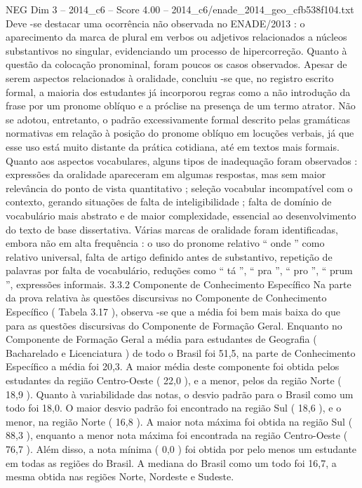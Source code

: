 \begin{textsample}{NEG Dim 3 – 2014\_c6 – Score 4.00 – 2014\_c6/enade\_2014\_geo\_cfb538f104.txt}
Deve -se destacar uma ocorrência não observada no ENADE/2013 : o aparecimento da marca de plural em verbos ou adjetivos relacionados a núcleos substantivos no singular, evidenciando um processo de hipercorreção.
Quanto à questão da colocação pronominal, foram poucos os casos observados.
Apesar de serem aspectos relacionados à oralidade, concluiu -se que, no registro escrito formal, a maioria dos estudantes já incorporou regras como a não introdução da frase por um pronome oblíquo e a próclise na presença de um termo atrator.
Não se adotou, entretanto, o padrão excessivamente formal descrito pelas gramáticas normativas em relação à posição do pronome oblíquo em locuções verbais, já que esse uso está muito distante da prática cotidiana, até em textos mais formais.
Quanto aos aspectos vocabulares, alguns tipos de inadequação foram observados : expressões da oralidade apareceram em algumas respostas, mas sem maior relevância do ponto de vista quantitativo ; seleção vocabular incompatível com o contexto, gerando situações de falta de inteligibilidade ; falta de domínio de vocabulário mais abstrato e de maior complexidade, essencial ao desenvolvimento do texto de base dissertativa.
Várias marcas de oralidade foram identificadas, embora não em alta frequência : o uso do pronome relativo “ onde ” como relativo universal, falta de artigo definido antes de substantivo, repetição de palavras por falta de vocabulário, reduções como “ tá ”, “ pra ”, “ pro ”, “ prum ”, expressões informais. 3.3.2 Componente de Conhecimento Específico Na parte da prova relativa às questões discursivas no Componente de Conhecimento Específico ( Tabela 3.17 ), observa -se que a média foi bem mais baixa do que para as questões discursivas do Componente de Formação Geral.
Enquanto no Componente de Formação Geral a média para estudantes de Geografia ( Bacharelado e Licenciatura ) de todo o Brasil foi 51,5, na parte de Conhecimento Específico a média foi 20,3.
A maior média deste componente foi obtida pelos estudantes da região Centro-Oeste ( 22,0 ), e a menor, pelos da região Norte ( 18,9 ).
Quanto à variabilidade das notas, o desvio padrão para o Brasil como um todo foi 18,0.
O maior desvio padrão foi encontrado na região Sul ( 18,6 ), e o menor, na região Norte ( 16,8 ).
A maior nota máxima foi obtida na região Sul ( 88,3 ), enquanto a menor nota máxima foi encontrada na região Centro-Oeste ( 76,7 ).
Além disso, a nota mínima ( 0,0 ) foi obtida por pelo menos um estudante em todas as regiões do Brasil.
A mediana do Brasil como um todo foi 16,7, a mesma obtida nas regiões Norte, Nordeste e Sudeste.

\end{textsample}

